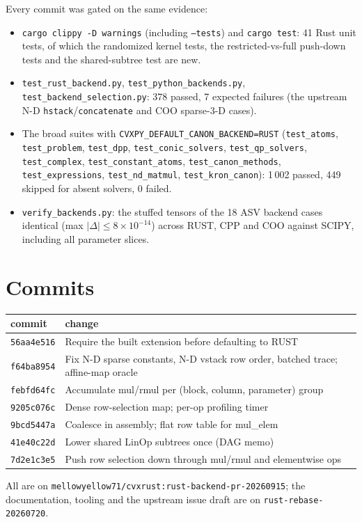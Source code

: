 \documentclass[11pt,a4paper]{article}
\newcommand{\code}[1]{\texttt{#1}}
\begin{document}
Every commit was gated on the same evidence:
\begin{itemize}
  \item \code{cargo clippy -D warnings} (including \code{--tests}) and \code{cargo test}: 41 Rust
  unit tests, of which the randomized kernel tests, the restricted-vs-full push-down tests and the
  shared-subtree test are new.
  \item \code{test\_rust\_backend.py}, \code{test\_python\_backends.py},
  \code{test\_backend\_selection.py}: 378 passed, 7 expected failures (the upstream N-D
  \code{hstack}/\code{concatenate} and COO sparse-3-D cases).
  \item The broad suites with \code{CVXPY\_DEFAULT\_CANON\_BACKEND=RUST}
  (\code{test\_atoms}, \code{test\_problem}, \code{test\_dpp}, \code{test\_conic\_solvers},
  \code{test\_qp\_solvers}, \code{test\_complex}, \code{test\_constant\_atoms},
  \code{test\_canon\_methods}, \code{test\_expressions}, \code{test\_nd\_matmul},
  \code{test\_kron\_canon}): 1\,002 passed, 449 skipped for absent solvers, 0 failed.
  \item \code{verify\_backends.py}: the stuffed tensors of the 18 ASV backend cases identical
  (max $|\Delta| \le 8\times10^{-14}$) across RUST, CPP and COO against SCIPY, including all parameter
  slices.
\end{itemize}

\section{Commits}

\begin{center}
\begin{tabular}{ll}
\toprule
commit & change \\
\midrule
\code{56aa4e516} & Require the built extension before defaulting to RUST \\
\code{f64ba8954} & Fix N-D sparse constants, N-D vstack row order, batched trace; affine-map oracle \\
\code{febfd64fc} & Accumulate mul/rmul per (block, column, parameter) group \\
\code{9205c076c} & Dense row-selection map; per-op profiling timer \\
\code{9bcd5447a} & Coalesce in assembly; flat row table for mul\_elem \\
\code{41e40c22d} & Lower shared LinOp subtrees once (DAG memo) \\
\code{7d2e1c3e5} & Push row selection down through mul/rmul and elementwise ops \\
\bottomrule
\end{tabular}
\end{center}
All are on \code{mellowyellow71/cvxrust:rust-backend-pr-20260915}; the documentation, tooling and
the upstream issue draft are on \code{rust-rebase-20260720}.
\end{document}
